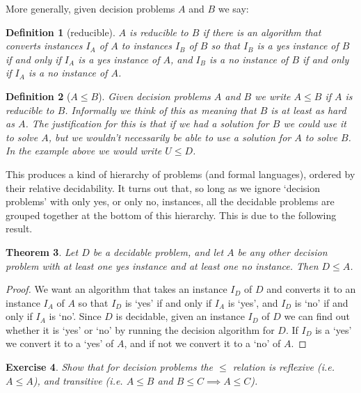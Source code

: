 \documentclass{article}
\theoremstyle{plain}
\newtheorem{theorem}{Theorem}[section]{\bfseries}{\itshape}
\newtheorem{definition}[theorem]{Definition}{\bfseries}{\upshape}
\newtheorem{exercise}[theorem]{Exercise}{\bfseries}{\upshape}
\theoremstyle{definition}
\begin{document}
More generally, given decision problems $A$ and $B$ we say: 

\begin{definition}[reducible]
\emph{$A$ is reducible to $B$} if there is an algorithm that converts instances $I_A$ of $A$ to instances $I_B$ of $B$ so that $I_B$ is a yes instance of $B$ if and only if $I_A$ is a yes instance of $A$, and $I_B$ is a no instance of $B$ if and only if $I_A$ is a no instance of $A$.\end{definition}

\begin{definition}[$A\leq B$]
Given decision problems $A$ and $B$ we write $A\leq B$ if $A$ is reducible to $B$. Informally we think of this as meaning that $B$ is at least as hard as $A$. The justification for this is that if we had a solution for $B$ we could use it to solve $A$, but we wouldn't necessarily be able to use a solution for $A$ to solve $B$. In the example above we would write $U\leq D$.
\end{definition} 

  

This produces a kind of hierarchy of problems (and formal languages), ordered by their relative decidability. It turns out that, so long as we ignore `decision problems' with only yes, or only no, instances, all the decidable problems are grouped together at the bottom of this hierarchy. This is due to the following result.  
\begin{theorem}
Let $D$ be a decidable problem, and let $A$ be any other decision problem with at least one yes instance and at least one no instance. Then $D\leq A$.
\end{theorem}
\begin{proof}
We want an algorithm that takes an instance $I_D$ of $D$ and converts it to an instance $I_A$ of $A$ so that $I_D$ is `yes' if and only if $I_A$ is `yes', and $I_D$ is `no' if and only if $I_A$ is `no'. Since $D$ is decidable, given an instance $I_D$ of $D$ we can find out whether it is `yes' or `no' by running the decision algorithm for $D$. If $I_D$ is a `yes' we convert it to a `yes' of $A$, and if not we convert it to a `no' of $A$. 
\end{proof}

\begin{exercise}
Show that for decision problems the $\leq$ relation is reflexive (i.e. $A\leq A$), and transitive (i.e. $A\leq B$ and $B\leq C\implies A\leq C$).
\end{exercise}
\end{document}
